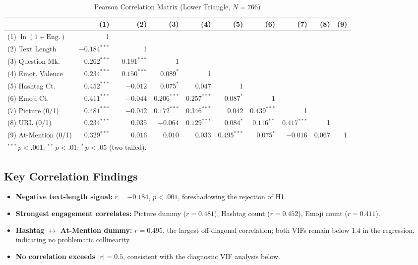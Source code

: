 \documentclass[12pt,a4paper]{article}
\begin{document}
\begin{table}[H]
\centering
\caption{Pearson Correlation Matrix (Lower Triangle, $N=766$)}
\label{tab:corr_full}
\small
\setlength{\tabcolsep}{3pt}
\begin{tabular}{lrrrrrrrrr}
\toprule
 & (1) & (2) & (3) & (4) & (5) & (6) & (7) & (8) & (9) \\
\midrule
(1) $\ln(1+\text{Eng.})$ & 1 & & & & & & & & \\
(2) Text Length & $-0.184^{***}$ & 1 & & & & & & & \\
(3) Question Mk. & $0.262^{***}$ & $-0.191^{***}$ & 1 & & & & & & \\
(4) Emot. Valence & $0.234^{***}$ & $0.150^{***}$ & $0.089^{*}$ & 1 & & & & & \\
(5) Hashtag Ct. & $0.452^{***}$ & $-0.012$ & $0.075^{*}$ & $0.047$ & 1 & & & & \\
(6) Emoji Ct. & $0.411^{***}$ & $-0.044$ & $0.206^{***}$ & $0.257^{***}$ & $0.087^{*}$ & 1 & & & \\
(7) Picture (0/1) & $0.481^{***}$ & $-0.042$ & $0.172^{***}$ & $0.346^{***}$ & $0.042$ & $0.439^{***}$ & 1 & & \\
(8) URL (0/1) & $0.234^{***}$ & $0.035$ & $-0.064$ & $0.129^{***}$ & $0.084^{*}$ & $0.116^{**}$ & $0.417^{***}$ & 1 & \\
(9) At-Mention (0/1) & $0.329^{***}$ & $0.016$ & $0.010$ & $0.033$ & $0.495^{***}$ & $0.075^{*}$ & $-0.016$ & $0.067$ & 1 \\
\bottomrule
\multicolumn{10}{l}{\small $^{***}\,p<.001$;\; $^{**}\,p<.01$;\; $^{*}\,p<.05$ (two-tailed).} \\
\end{tabular}
\end{table}

\subsection{Key Correlation Findings}

\begin{itemize}
    \item \textbf{Negative text-length signal:} $r=-0.184$, $p<.001$, foreshadowing the rejection of H1.
    \item \textbf{Strongest engagement correlates:} Picture dummy ($r=0.481$), Hashtag count ($r=0.452$), Emoji count ($r=0.411$).
    \item \textbf{Hashtag $\leftrightarrow$ At-Mention dummy:} $r=0.495$, the largest off-diagonal correlation; both VIFs remain below 1.4 in the regression, indicating no problematic collinearity.
    \item \textbf{No correlation exceeds $|r|=0.5$}, consistent with the diagnostic VIF analysis below.
\end{itemize}
\end{document}
